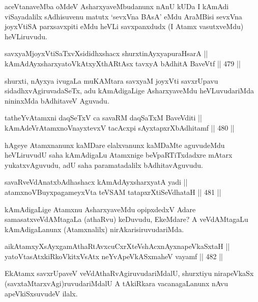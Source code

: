 \begin{artha}
aceVtanaveMba oMdeV AsharxyaveMbudanunx nAnU kUDa I kAmAdi
viSayadalilx sAdhisuvenu matutx `sevxVna BAsA' eMdu AraMBisi sevxVna
joyxVtiSA parxsavxpiti eMdu heVLi savxpanxdudx (I Atamx vasutxveMdu)
heVLiruvudu.
\end{artha}

\begin{shl}
savxyaMjoyxVtiSaTxvXsididhxshacx shurxtinAyxyapuraHsarA || \\
kAmAdAyxsharxyatoVkAtxyX\s thARtAsx tavxyA bAdhitA BaveVtf \hfill || 479 ||  
\end{shl}

\begin{artha}
shurxti, nAyxya ivugaLa muKAMtara savxyaM joyxVti savxrUpavu
sidadhxvAgiruvadaSeTx, adu kAmAdigaLige AsharxyaveMdu heVLuvudariMda
nininxMda bAdhitaveV Aguvadu.
\end{artha}

\begin{shl}
tatheYvA\s \s tamxni daqSeTxV ca savaRM daqSaTxM BaveVditi || \\
kAmAdeVrAtamxnoV\s nayxtevxV tacAcxpi sAyxtapxrXbAdhitamf \hfill || 480 ||  
\end{shl}

\begin{artha}
hAgeye Atamxnanunx kaMDare elalxvanunx kaMDaMte aguvudeMdu heVLiruvudU
saha kAmAdigaLu Atamxnige beVpaRTiTxdadxre mAtarx yukatxvAguvudu, adU
saha paramatadalilx bAdhitavAguvudu.
\end{artha}

\begin{shl}
savaRveVdAnatxbAdhashacx kAmAdAyxsharxyatA yadi ||  \\
atamxnoV\s BuyxpagameyxVta teVSAM tatapxrXtiSeVdhataH \hfill || 481 ||  
\end{shl}

\begin{artha}
kAmAdigaLige Atamxnu AsharxyaveMdu opipxdedxV Adare
samasatxveVdAMtagaLa (athaRvu) keDuvudu, EkeMdare? A veVdAMtagaLu
kAmAdigaLanunx (Atamxnalilx) nirAkarisiruvudariMda.
\end{artha}

\begin{shl}
aikAtamxyXsAyx\s \s gamAthaRtAvxcuCxrXteVshAcxnAyxnapeVkaSxtaH || \\
yatoV\s tasAtxkiRkoVkitxVsAtx neYvApeVkASxmaheV vayamf \hfill || 482 ||  
\end{shl}

\begin{artha}
EkAtamx savxrUpaveV veVdAthaRvAgiruvudariMdalU, shurxtiyu nirapeVkaSx
(savxtaMtarxvAgi)ruvudariMdalU A tAkiRkara vacanagaLanunx nAvu
apeVkiSxsuvudeV ilalx.
\end{artha}

